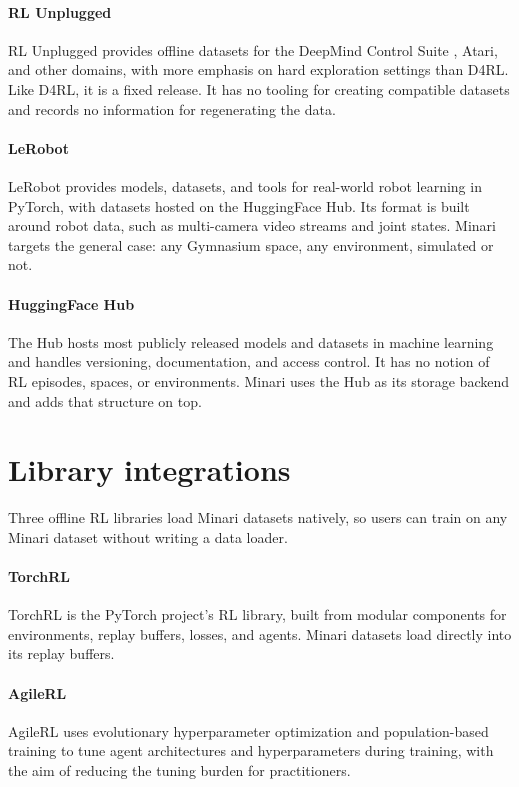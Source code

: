 \documentclass{article}
\begin{document}
\paragraph{RL Unplugged} RL Unplugged \citep{rlunplugged} provides offline datasets for the DeepMind Control Suite \citep{deepmindcontrolsuite}, Atari, and other domains, with more emphasis on hard exploration settings than D4RL. Like D4RL, it is a fixed release. It has no tooling for creating compatible datasets and records no information for regenerating the data.

\paragraph{LeRobot} LeRobot \citep{lerobot} provides models, datasets, and tools for real-world robot learning in PyTorch, with datasets hosted on the HuggingFace Hub. Its format is built around robot data, such as multi-camera video streams and joint states. Minari targets the general case: any Gymnasium space, any environment, simulated or not.

\paragraph{HuggingFace Hub} The Hub hosts most publicly released models and datasets in machine learning and handles versioning, documentation, and access control. It has no notion of RL episodes, spaces, or environments. Minari uses the Hub as its storage backend and adds that structure on top.

\section{Library integrations}
\label{sec:integrations}
Three offline RL libraries load Minari datasets natively, so users can train on any Minari dataset without writing a data loader.

\paragraph{TorchRL} TorchRL \citep{torchrl} is the PyTorch project's RL library, built from modular components for environments, replay buffers, losses, and agents. Minari datasets load directly into its replay buffers.

\paragraph{AgileRL}
AgileRL \citep{agilerl} uses evolutionary hyperparameter optimization and population-based training to tune agent architectures and hyperparameters during training, with the aim of reducing the tuning burden for practitioners.
\end{document}

